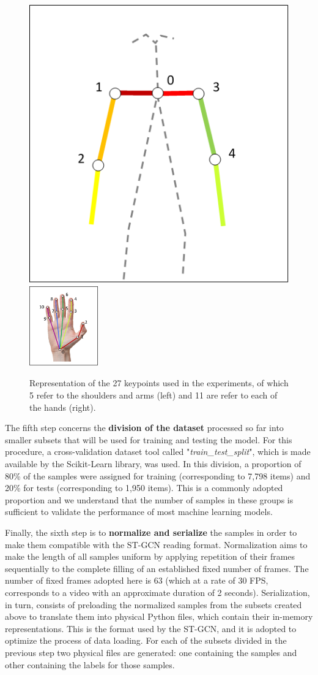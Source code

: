 \begin{figure}[ht]
    \centering
    \includegraphics[width=4
    cm]{images/filtered_keypoints_body}
    \includegraphics[width=3cm]{images/filtered_keypoints_hand}
    \caption{Representation of the 27 keypoints used in the experiments, of which 5 refer to the shoulders and arms (left) and 11 are refer to each of the hands (right).}
    \label{fig:filtered-keypoints}
\end{figure}


The fifth step concerns the \textbf{division of the dataset} processed so far into smaller subsets that will be used for training and testing the model. For this procedure, a cross-validation dataset tool called "\textit{train\_test\_split}", which is made available by the Scikit-Learn \cite{scikit-learn} library, was used. In this division, a proportion of 80\% of the samples were assigned for training (corresponding to 7,798 items) and 20\% for tests (corresponding to 1,950 items). This is a commonly adopted proportion and we understand that the number of samples in these groups is sufficient to validate the performance of most machine learning models.

Finally, the sixth step is to \textbf{normalize and serialize} the samples in order to make them compatible with the ST-GCN reading format. Normalization aims to make the length of all samples uniform by applying repetition of their frames sequentially to the complete filling of an established fixed number of frames. The number of fixed frames adopted here is 63 (which at a rate of 30 FPS, corresponds to a video with an approximate duration of 2 seconds). Serialization, in turn, consists of preloading the normalized samples from the subsets created above to translate them into physical Python \cite{python} files, which contain their in-memory representations. This is the format used by the ST-GCN, and it is adopted to optimize the process of data loading. For each of the subsets divided in the previous step two physical files are generated: one containing the samples and other containing the labels for those samples.

